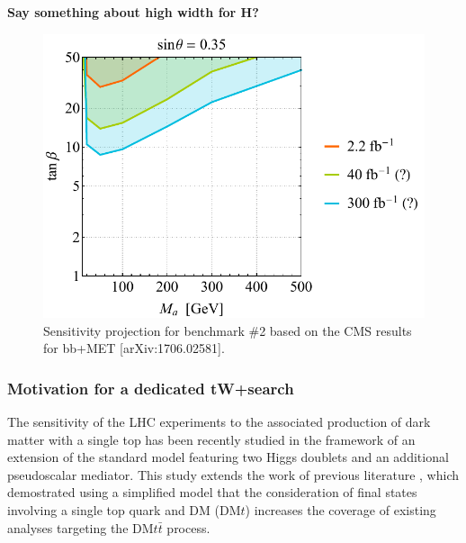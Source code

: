 \textbf{Say something about high width for H?}

\begin{figure}
\includegraphics[width=.6\textwidth]{texinputs/04_grid/figures/DMHF//MAvsTB.pdf}
\caption{Sensitivity projection for benchmark \#2 based on the CMS results for bb+MET [arXiv:1706.02581].}
\label{DMHF:bbscan}
\end{figure}



\clearpage
\subsubsection{Motivation for a dedicated tW+\met search}

The sensitivity of the LHC experiments to the associated 
production of dark matter with a single top has been recently studied \cite{Pani:2017qyd} in the framework
of an extension of the standard model featuring two Higgs doublets and
an additional pseudoscalar mediator. 
This study extends the work of previous literature \cite{Pinna:2017tay}, which demostrated using
a simplified model that the consideration of final states involving a single top quark and DM (DM$t$)
increases the coverage of existing analyses targeting the DM$t\bar t$ process.  

